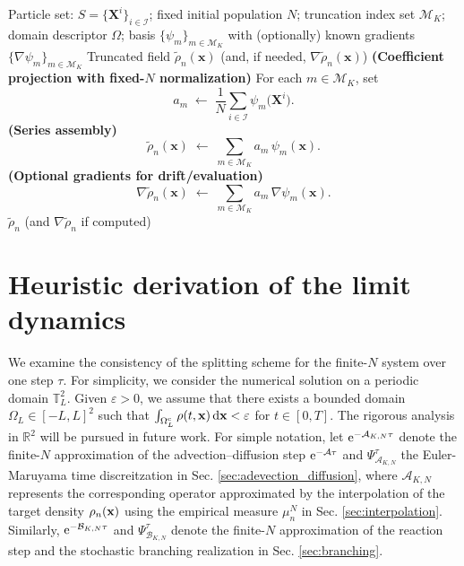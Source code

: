 \documentclass[preprint,12pt]{elsarticle}
\theoremstyle{definition}
\theoremstyle{remark}
\begin{document}
\begin{algorithm}
\caption{Interpolation Step (fixed-$N$ normalization)}\label{alg:interpolate}
\begin{algorithmic}
\Require Particle set: $S=\{ \mathbf{X}^i \}_{i\in \mathcal{I}}$; fixed initial population $N$; truncation index set $\mathcal{M}_K$; domain descriptor $\Omega$; basis $\{\psi_m\}_{m\in\mathcal{M}_K}$ with (optionally) known gradients $\{\nabla\psi_m\}_{m\in\mathcal{M}_K}$
\Ensure Truncated field $\tilde{\rho}_n(\mathbf{x})$ (and, if needed, $\nabla\tilde{\rho}_n(\mathbf{x})$)
    \State \textbf{(Coefficient projection with fixed-$N$ normalization)}
    \State For each $m\in\mathcal{M}_K$, set
    \[
      a_m \;\gets\; \frac{1}{N}\sum_{i\in\mathcal{I}} \psi_m\!\big(\mathbf{X}^i\big).
    \]
    \State \textbf{(Series assembly)}
    \[
      \tilde{\rho}_n(\mathbf{x}) \;\gets\; \sum_{m\in\mathcal{M}_K} a_m\,\psi_m(\mathbf{x}).
    \]
    \State \textbf{(Optional gradients for drift/evaluation)}
      \[
        \nabla\tilde{\rho}_n(\mathbf{x}) \;\gets\; \sum_{m\in\mathcal{M}_K} a_m\,\nabla\psi_m(\mathbf{x}).
      \]
    \EndIf
    \State \Return $\tilde{\rho}_n$ (and $\nabla\tilde{\rho}_n$ if computed)
\EndProcedure
\end{algorithmic}
\end{algorithm}

\section{Heuristic derivation of the limit dynamics}

We examine the consistency of the splitting scheme for the finite-$N$ system over one step $\tau$. For simplicity, we consider the numerical solution on a periodic domain $\mathbb{T}_L^2$. Given $\varepsilon > 0$, we assume that there exists a bounded domain $\Omega_L \in [-L, L]^2$ such that 
$
\int_{\Omega_L^{\rm c}} \rho(t, \mathbf x) \mathop{}\!\mathrm{d} \mathbf x < \varepsilon
$ for $t\in [0, T]$. 
The rigorous analysis in $\mathbb{R}^2$ will be pursued in future work. 
%
For simple notation, let ${\rm e}^{-\mathcal{A}_{K,N} \tau}$ denote the finite-$N$ approximation of the advection--diffusion step ${\rm e}^{-\mathcal{A} \tau}$ and $\Psi_{{\mathcal{A}}_{K,N}}^{\tau}$ the Euler-Maruyama time discreitzation in Sec. \ref{sec:adevection_diffusion}, where $\mathcal{A}_{K,N}$ represents the corresponding operator approximated by the interpolation of the target density $\rho_n(\mathbf x)$ using the empirical measure $\mu_n^N$ in Sec. \ref{sec:interpolation}. Similarly, ${\rm e}^{-\mathcal{B}_{K,N} \tau}$ and $\Psi_{{\mathcal{B}}_{K,N}}^{\tau}$ denote the finite-$N$ approximation of the reaction step and the stochastic branching realization in Sec. \ref{sec:branching}. 
\end{document}
